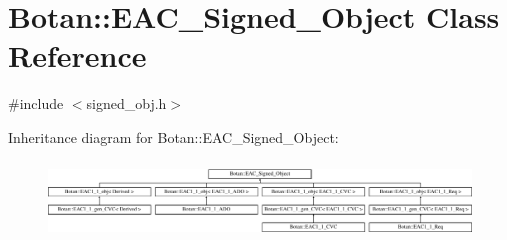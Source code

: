 \hypertarget{classBotan_1_1EAC__Signed__Object}{\section{Botan\-:\-:E\-A\-C\-\_\-\-Signed\-\_\-\-Object Class Reference}
\label{classBotan_1_1EAC__Signed__Object}
}


{\ttfamily \#include $<$signed\-\_\-obj.\-h$>$}

Inheritance diagram for Botan\-:\-:E\-A\-C\-\_\-\-Signed\-\_\-\-Object\-:\begin{figure}[H]
\begin{center}
\leavevmode
\includegraphics[height=2.058824cm]{classBotan_1_1EAC__Signed__Object}
\end{center}
\end{figure}
